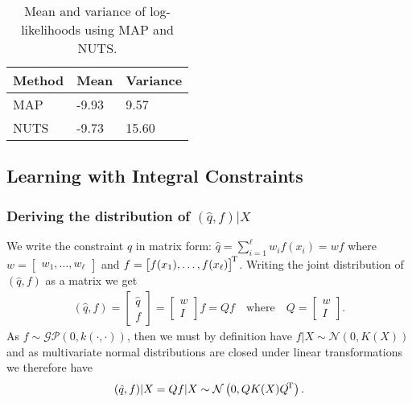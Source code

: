 \begin{table}[H]
  \centering
  \begin{tabular}{lll}
    \toprule
    Method & Mean  & Variance \\
    \midrule
    MAP    & -9.93 & 9.57     \\
    NUTS   & -9.73 & 15.60    \\
    \bottomrule
  \end{tabular}  
  \caption{
    Mean and variance of log-likelihoods using MAP and NUTS.
  }
  \label{tab:gp:map_nuts_ll_mean_var}
\end{table}

\subsection{Learning with Integral Constraints}

\subsubsection{Deriving the distribution of $(\hat{q}, f) | X$}

We write the constraint $\hat{q}$ in matrix form:
$
  \hat{q} = \sum_{i=1}^\ell w_i f(x_i) = {w} f
$
where $w = \begin{bmatrix} w_1, \ldots, w_\ell \end{bmatrix}$
and $f = {\begin{bmatrix} f(x_1), \ldots, f(x_\ell) \end{bmatrix}}^{\!\text{T}}$.
%
Writing the joint distribution of $(\hat{q}, f)$ as a matrix we get
\begin{align*}
  (\hat{q}, f)
  = \left[ \begin{array}{c} \hat{q} \\ \hline f \end{array} \right]
  = \left[ \begin{array}{c} w \\ \hline I \end{array} \right] f
  = Q f
  \quad \text{where} \quad
  Q = \left[ \begin{array}{c} w \\ \hline I \end{array} \right].
\end{align*}
%
As $f \sim \mathcal{GP}(0, k(\cdot, \cdot))$, then we must by definition have
$f | X \sim \mathcal{N}\left( 0, K(X) \right)$
and as multivariate normal distributions are closed under linear transformations
we therefore have
\begin{align*}
  (\hat{q}, f) | X
  = Q f | X
  \sim \mathcal{N}\left( 0, Q K(X) {Q}^{\!\text{T}} \right).
\end{align*}

